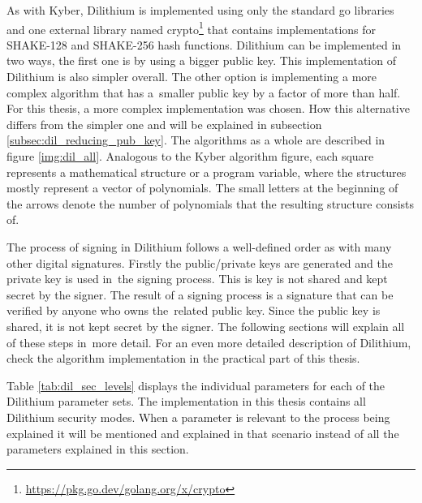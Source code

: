 As with Kyber, Dilithium is implemented using only the standard go libraries and one external library named crypto\footnote{\url{https://pkg.go.dev/golang.org/x/crypto}} that contains implementations for SHAKE-128 and SHAKE-256 hash functions. Dilithium can be implemented in two ways, the first one is by using a bigger public key. This implementation of Dilithium is also simpler overall. The other option is implementing a more complex algorithm that has a~smaller public key by a factor of more than half. For this thesis, a more complex implementation was chosen. How this alternative differs from the simpler one and will be explained in subsection \ref{subsec:dil_reducing_pub_key}. The algorithms as a whole are described in figure \ref{img:dil_all}. Analogous to the Kyber algorithm figure, each square represents a mathematical structure or a program variable, where the structures mostly represent a vector of polynomials. The small letters at the beginning of the arrows denote the number of polynomials that the resulting structure consists of.

The process of signing in Dilithium follows a well-defined order as with many other digital signatures. Firstly the public/private keys are generated and the private key is used in~the signing process. This is key is not shared and kept secret by the signer. The result of a signing process is a signature that can be verified by anyone who owns the~related public key. Since the public key is shared, it is not kept secret by the signer. The following sections will explain all of these steps in~more detail. For an even more detailed description of Dilithium, check the algorithm implementation in the practical part of this thesis.


Table \ref{tab:dil_sec_levels} displays the individual parameters for each of the Dilithium parameter sets. The implementation in this thesis contains all Dilithium security modes. When a parameter is relevant to the process being explained it will be mentioned and explained in that scenario instead of all the parameters explained in this section.

